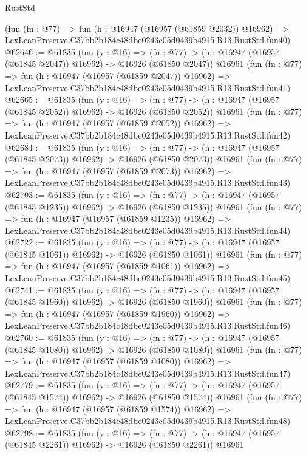 \begin{lexlean}{RustStd}
\begin{coremodule}
    (fun (fn : @77) =>
    fun (h : @16947 (@16957 (@61859 @2032)) @16962) =>
    LexLeanPreserve.C37bb2b184c48dbe0243e05d0439b4915.R13.RustStd.fun40)
@62646 := @61835
    (fun (y : @16) =>
    (fn : @77) -> (h : @16947 (@16957 (@61845 @2047)) @16962) -> @16926 (@61850 @2047))
    @16961
    (fun (fn : @77) =>
    fun (h : @16947 (@16957 (@61859 @2047)) @16962) =>
    LexLeanPreserve.C37bb2b184c48dbe0243e05d0439b4915.R13.RustStd.fun41)
@62665 := @61835
    (fun (y : @16) =>
    (fn : @77) -> (h : @16947 (@16957 (@61845 @2052)) @16962) -> @16926 (@61850 @2052))
    @16961
    (fun (fn : @77) =>
    fun (h : @16947 (@16957 (@61859 @2052)) @16962) =>
    LexLeanPreserve.C37bb2b184c48dbe0243e05d0439b4915.R13.RustStd.fun42)
@62684 := @61835
    (fun (y : @16) =>
    (fn : @77) -> (h : @16947 (@16957 (@61845 @2073)) @16962) -> @16926 (@61850 @2073))
    @16961
    (fun (fn : @77) =>
    fun (h : @16947 (@16957 (@61859 @2073)) @16962) =>
    LexLeanPreserve.C37bb2b184c48dbe0243e05d0439b4915.R13.RustStd.fun43)
@62703 := @61835
    (fun (y : @16) =>
    (fn : @77) -> (h : @16947 (@16957 (@61845 @1235)) @16962) -> @16926 (@61850 @1235))
    @16961
    (fun (fn : @77) =>
    fun (h : @16947 (@16957 (@61859 @1235)) @16962) =>
    LexLeanPreserve.C37bb2b184c48dbe0243e05d0439b4915.R13.RustStd.fun44)
@62722 := @61835
    (fun (y : @16) =>
    (fn : @77) -> (h : @16947 (@16957 (@61845 @1061)) @16962) -> @16926 (@61850 @1061))
    @16961
    (fun (fn : @77) =>
    fun (h : @16947 (@16957 (@61859 @1061)) @16962) =>
    LexLeanPreserve.C37bb2b184c48dbe0243e05d0439b4915.R13.RustStd.fun45)
@62741 := @61835
    (fun (y : @16) =>
    (fn : @77) -> (h : @16947 (@16957 (@61845 @1960)) @16962) -> @16926 (@61850 @1960))
    @16961
    (fun (fn : @77) =>
    fun (h : @16947 (@16957 (@61859 @1960)) @16962) =>
    LexLeanPreserve.C37bb2b184c48dbe0243e05d0439b4915.R13.RustStd.fun46)
@62760 := @61835
    (fun (y : @16) =>
    (fn : @77) -> (h : @16947 (@16957 (@61845 @1080)) @16962) -> @16926 (@61850 @1080))
    @16961
    (fun (fn : @77) =>
    fun (h : @16947 (@16957 (@61859 @1080)) @16962) =>
    LexLeanPreserve.C37bb2b184c48dbe0243e05d0439b4915.R13.RustStd.fun47)
@62779 := @61835
    (fun (y : @16) =>
    (fn : @77) -> (h : @16947 (@16957 (@61845 @1574)) @16962) -> @16926 (@61850 @1574))
    @16961
    (fun (fn : @77) =>
    fun (h : @16947 (@16957 (@61859 @1574)) @16962) =>
    LexLeanPreserve.C37bb2b184c48dbe0243e05d0439b4915.R13.RustStd.fun48)
@62798 := @61835
    (fun (y : @16) =>
    (fn : @77) -> (h : @16947 (@16957 (@61845 @2261)) @16962) -> @16926 (@61850 @2261))
    @16961

\end{coremodule}
\end{lexlean}
